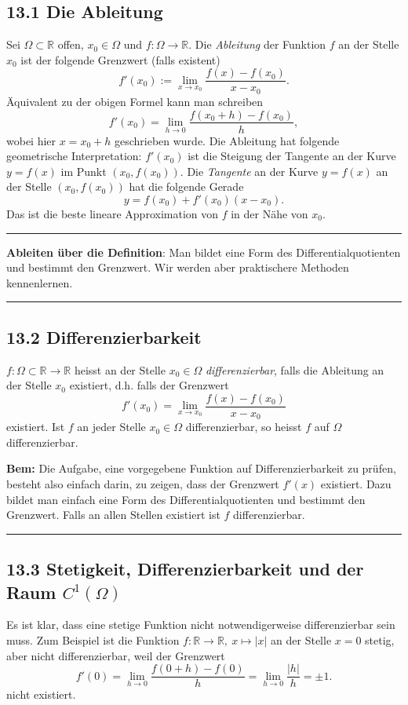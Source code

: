 \documentclass[a4paper,landscape,8pt]{extarticle}
\newcommand{\R}{\mathbb{R}}
\newcommand{\abs}[1]{\left\lvert #1 \right\rvert}
\newcommand{\sep}{\vspace{5pt}\noindent\hrule\vspace{5pt}}
\newcommand{\Bem}{\textbf{Bem: }}
\begin{document}
\begin{multicols*}{4}
\subsection{13.1 Die Ableitung}

\Def Sei $\Omega\subset\R$ offen, $x_0\in\Omega$ und $f\colon\Omega\to\R$. Die
\emph{Ableitung} der Funktion $f$ an der Stelle $x_0$ ist der folgende Grenzwert
(falls existent)
\[
f'(x_0) := \lim_{x\to x_0} \frac{f(x)-f(x_0)}{x-x_0}.
\]
Äquivalent zu der obigen Formel kann man schreiben
\[
f'(x_0) = \lim_{h\to 0} \frac{f(x_0+h)-f(x_0)}{h},
\]
wobei hier $x=x_0+h$ geschrieben wurde. Die Ableitung hat folgende geometrische
Interpretation: $f'(x_0)$ ist die Steigung der Tangente an der Kurve $y=f(x)$ im
Punkt $(x_0,f(x_0))$. Die \emph{Tangente} an der Kurve $y=f(x)$ an der Stelle
$(x_0,f(x_0))$ hat die folgende Gerade
\[
y=f(x_0) + f'(x_0)(x-x_0).
\]
Das ist die beste lineare Approximation von $f$ in der Nähe von $x_0$.

\sep

\textbf{Ableiten über die Definition}: Man bildet eine Form des
Differentialquotienten und bestimmt den Grenzwert. Wir werden aber praktischere
Methoden kennenlernen.

\sep

\subsection{13.2 Differenzierbarkeit}

\Def $f\colon\Omega\subset\R\to\R$ heisst an der Stelle $x_0\in\Omega$
\emph{differenzierbar}, falls die Ableitung an der Stelle $x_0$ existiert, d.h.
falls der Grenzwert
\[
f'(x_0) = \lim_{x\to x_0} \frac{f(x)-f(x_0)}{x-x_0}
\]
existiert. Ist $f$ an jeder Stelle $x_0\in\Omega$ differenzierbar, so heisst $f$
auf $\Omega$ differenzierbar.

\Bem Die Aufgabe, eine vorgegebene Funktion auf Differenzierbarkeit zu prüfen,
besteht also einfach darin, zu zeigen, dass der Grenzwert $f'(x)$ existiert.
Dazu bildet man einfach eine Form des Differentialquotienten und bestimmt den
Grenzwert. Falls an allen Stellen existiert ist $f$ differenzierbar.

\sep

\subsection{13.3 Stetigkeit, Differenzierbarkeit und der Raum $C^1(\Omega)$}

Es ist klar, dass eine stetige Funktion nicht notwendigerweise differenzierbar
sein muss. Zum Beispiel ist die Funktion $f\colon \R\to\R, \ x\mapsto \abs{x}$
an der Stelle $x=0$ stetig, aber nicht differenzierbar, weil der Grenzwert
\[
f'(0) = \lim_{h\to 0} \frac{f(0+h)-f(0)}{h} = \lim_{h\to 0}\frac{\abs{h}}{h} =
\pm 1.
\]
nicht existiert.


\end{multicols*}
\end{document}
